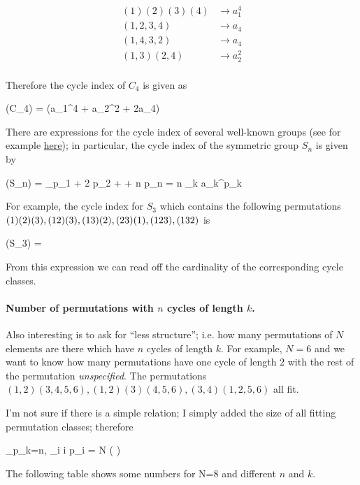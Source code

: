 \begin{align*}
  (1)(2)(3)(4) &\rightarrow a_1^4 \\
  (1,2,3,4)  &\rightarrow a_4 \\
  (1,4,3,2)  &\rightarrow a_4 \\
  (1,3)(2,4) &\rightarrow a_2^2 \\
\end{align*}

Therefore the cycle index of $C_4$ is given as

\bee
\Zc(C_4) =  (a_1^4 + a_2^2 + 2a_4)
\eee

There are expressions for the cycle index of several well-known groups (see for example \href{https://en.wikipedia.org/wiki/Cycle_index}{here}); in particular, the cycle index of the symmetric group $S_n$ is given by

\bee
\Zc(S_n) = \sum_{p_1 + 2 p_2 + \cdots + n p_n = n}  \prod_k a_k^{p_k}
\eee

For example, the cycle index for $S_3$ which contains the following permutations $(1)(2)(3), \\ (12)(3), (13)(2), (23)(1), (123),(132)$ is

\bee
\Zc(S_3) =  \left[ a_1^3 + 3 a_1 a_2 + 2a_3 \right]
\eee

From this expression we can read off the cardinality of the corresponding cycle classes.


\paragraph{Number of permutations with $n$ cycles of length $k$.} Also interesting is to ask for ``less structure''; i.e. how many permutations of $N$ elements are there which have $n$ cycles of length $k$. For example, $N=6$ and we want to know how many permutations have one cycle of length $2$ with the rest of the permutation \emph{unspecified}. The permutations $(1,2)(3,4,5,6), (1,2)(3)(4,5,6), (3,4)(1,2,5,6)$ all fit.

I'm not sure if there is a simple relation; I simply added the size of all fitting permutation classes; therefore

\bee
\sum_{p_k=n, \sum_i i p_i = N } \left(  \right)
\eee

The following table shows some numbers for N=8 and different $n$ and $k$.

\vspace{2mm}

